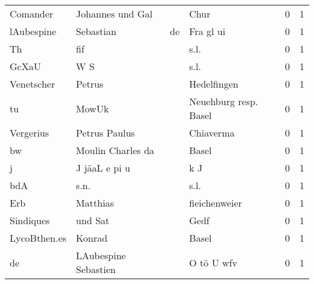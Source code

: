 \begin{center}
\begin{tiny}
\begin{longtabu}{llllrr}
                 Comander &                   Johannes und Gal &             &                                        Chur &          0 &         1 \\
               lAubespine &                          Sebastian &          de &                                   Fra gl ui &          0 &         1 \\
                       Th &                                fif &             &                                        s.l. &          0 &         1 \\
                    GcXaU &                                W S &             &                                        s.l. &          0 &         1 \\
               Venetscher &                             Petrus &             &                                 Hedelfingen &          0 &         1 \\
                       tu &                              MowUk &             &                       Neuehburg resp. Basel &          0 &         1 \\
                Vergerius &                      Petrus Paulus &             &                                   Chiaverma &          0 &         1 \\
                       bw &                  Moulin Charles da &             &                                       Basel &          0 &         1 \\
                        j &                      J jäaL e pi u &             &                                         k J &          0 &         1 \\
                      bdA &                               s.n. &             &                                        s.l. &          0 &         1 \\
                      Erb &                           Matthias &             &                               fieichenweier &          0 &         1 \\
                Sindiques &                            und Sat &             &                                        Gedf &          0 &         1 \\
             LycoBthen.es &                             Konrad &             &                                       Basel &          0 &         1 \\
                       de &               LAubespine Sebastien &             &                                  O tö U wfv &          0 &         1 \\

\end{longtabu}
\end{tiny}
\end{center}
